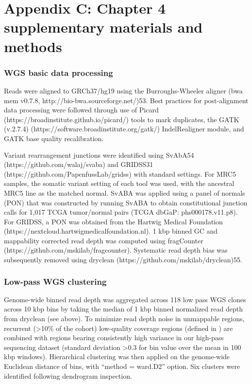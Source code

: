 \documentclass[phd,tocprelim]{cornell}
\begin{document}
\chapter*{Appendix C: Chapter 4 supplementary materials and methods} \label{app:c}
\subsection*{WGS basic data processing} \label{app:tc_wgs_processing}
Reads were aligned to GRCh37/hg19 using the Burroughs-Wheeler aligner (bwa mem v0.7.8, http://bio-bwa.sourceforge.net/)53. Best practices for post-alignment data processing were followed through use of Picard (https://broadinstitute.github.io/picard/) tools to mark duplicates, the GATK (v.2.7.4) (https://software.broadinstitute.org/gatk/) IndelRealigner module, and GATK base quality recalibration.

Variant rearrangement junctions were identified using SvAbA54 (https://github.com/walaj/svaba) and GRIDSS31 (https://github.com/PapenfussLab/gridss) with standard settings. For MRC5 samples, the somatic variant setting of each tool was used, with the ancestral MRC5 line as the matched normal.  SvABA was applied using a panel of normals (PON) that was constructed by running SvABA to obtain constitutional junction calls for 1,017 TCGA tumor/normal pairs (TCGA dbGaP: phs000178.v11.p8).  For GRIDSS, a PON was obtained from the Hartwig Medical Foundation (https://nextcloud.hartwigmedicalfoundation.nl). 1 kbp binned GC and mappability corrected read depth was computed using fragCounter (https://github.com/mskilab/fragcounter). Systematic read depth bias was subsequently removed using dryclean (https://github.com/mskilab/dryclean)55.

\subsection*{Low-pass WGS clustering}
Genome-wide binned read depth was aggregated across 118 low pass WGS clones across 10 kbp bins by taking the median of 1 kbp binned normalized read depth from dryclean (see above). To minimize read depth noise in unmappable regions, recurrent (>10\% of the cohort) low-quality coverage regions (defined in \cite{Hadi2020-um}) are combined with regions bearing consistently high variance in our high-pass sequencing dataset (standard deviation >0.3 for bin value over the mean in 100 kbp windows). Hierarchical clustering was then applied on the genome-wide Euclidean distance of bins, with “method = ward.D2” option. Six clusters were identified following dendrogram inspection.  
\end{document}
